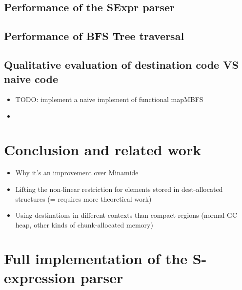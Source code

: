 \documentclass[english]{jflart}
\begin{document}
\subsection{Performance of the SExpr parser}

\subsection{Performance of BFS Tree traversal}\label{ssec:benchmark-parser}

\subsection{Qualitative evaluation of destination code VS naive code}

\begin{itemize}
\item TODO: implement a naive implement of functional mapMBFS
\item \end{itemize}

\section{Conclusion and related work}
\begin{itemize}
\item Why it's an improvement over Minamide

\item Lifting the non-linear restriction for elements stored in dest-allocated structures (= requires more theoretical work)

\item Using destinations in different contexts than compact regions (normal GC heap, other kinds of chunk-allocated memory)
\end{itemize}

\appendix

\section{Full implementation of the S-expression parser}\label{ann:parse-s-expr}
\end{document}
